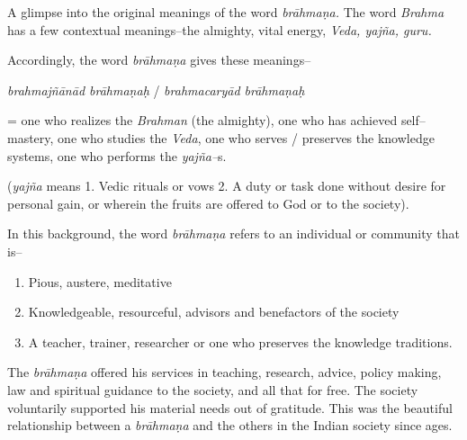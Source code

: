 A glimpse into the original meanings of the word \textit{brāhmaṇa.} The word \textit{Brahma} has a few contextual meanings–the almighty, vital energy, \textit{Veda, yajña, guru.}

Accordingly, the word \textit{brāhmaṇa} gives these meanings–

\textit{brahmajñānād brāhmaṇaḥ} / \textit{brahmacaryād brāhmaṇaḥ}

= one who realizes the \textit{Brahman} (the almighty), one who has achieved self–mastery, one who studies the \textit{Veda}, one who serves / preserves the knowledge systems, one who performs the \textit{yajña–}s.

(\textit{yajña} means 1. Vedic rituals or vows 2. A duty or task done without desire for personal gain, or wherein the fruits are offered to God or to the society). 

In this background, the word \textit{brāhmaṇa} refers to an individual or community that is–

\begin{enumerate}
\item Pious, austere, meditative 

 \item Knowledgeable, resourceful, advisors and benefactors of the society 

 \item A teacher, trainer, researcher or one who preserves the knowledge traditions.

\end{enumerate}

The \textit{brāhmaṇa} offered his services in teaching, research, advice, policy making, law and spiritual guidance to the society, and all that for free. The society voluntarily supported his material needs out of gratitude. This was the beautiful relationship between a \textit{brāhmaṇa} and the others in the Indian society since ages.

